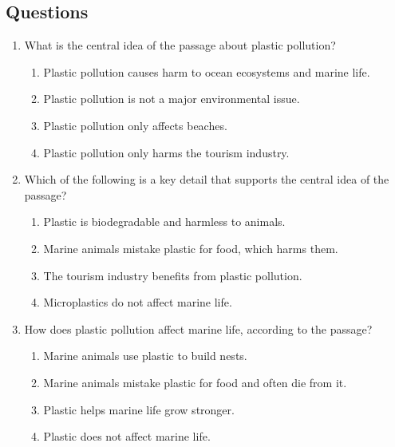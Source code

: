 \documentclass[12pt]{article}
\begin{document}
\subsection*{Questions}
\begin{enumerate}

    \item What is the central idea of the passage about plastic pollution?
    \begin{enumerate}[label=\Alph*.]
        \item Plastic pollution causes harm to ocean ecosystems and marine life.
        \item Plastic pollution is not a major environmental issue.
        \item Plastic pollution only affects beaches.
        \item Plastic pollution only harms the tourism industry.
    \end{enumerate}

    \vspace{0.5cm}

    \item Which of the following is a key detail that supports the central idea of the passage?
    \begin{enumerate}[label=\Alph*.]
        \item Plastic is biodegradable and harmless to animals.
        \item Marine animals mistake plastic for food, which harms them.
        \item The tourism industry benefits from plastic pollution.
        \item Microplastics do not affect marine life.
    \end{enumerate}

    \vspace{0.5cm}

    \item How does plastic pollution affect marine life, according to the passage?
    \begin{enumerate}[label=\Alph*.]
        \item Marine animals use plastic to build nests.
        \item Marine animals mistake plastic for food and often die from it.
        \item Plastic helps marine life grow stronger.
        \item Plastic does not affect marine life.
    \end{enumerate}


\end{enumerate}
\end{document}
